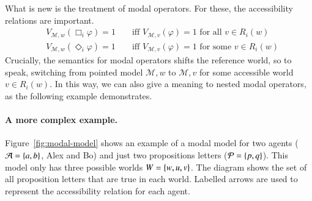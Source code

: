 \documentclass[nobib,nofonts]{tufte-handout}
\renewcommand{\phi}{\ensuremath{\varphi}}
\newcommand{\Model}{\ensuremath{\mathcal{M}}}
\begin{document}
\noindent What is new is the treatment of modal operators.
For these, the accessibility relations are important.
%
\begin{align*}
    & V_{\Model, w}(\Box_i \phi) = 1 & & \text{ \ iff \ } V_{\Model, v}(\phi) = 1 \text{ for all $v \in R_i(w)$} \\
    & V_{\Model, w}(\Diamond_i \phi) = 1 & & \text{ \ iff \ } V_{\Model, v}(\phi) = 1 \text{ for some $v \in R_i(w)$}
\end{align*}
%
Crucially, the semantics for modal operators shifts the reference world, so to speak, switching from pointed model $\Model, w$ to $\Model, v$ for some accessible world $v \in R_{i}(w)$.
In this way, we can also give a meaning to nested modal operators, as the following example demonstrates.

\paragraph{A more complex example.}
Figure~\ref{fig:modal-model} shows an example of a modal model for two agents ($\mathcal{A} = \left\{a,b\right\}$, Alex and Bo) and just two propositions letters ($\mathcal{P} = \left\{p, q\right\}$).
This model only has three possible worlds $W = \left\{w,u,v\right\}$.
The diagram shows the set of all proposition letters that are true in each world.
Labelled arrows are used to represent the accessibility relation for each agent.
\end{document}
